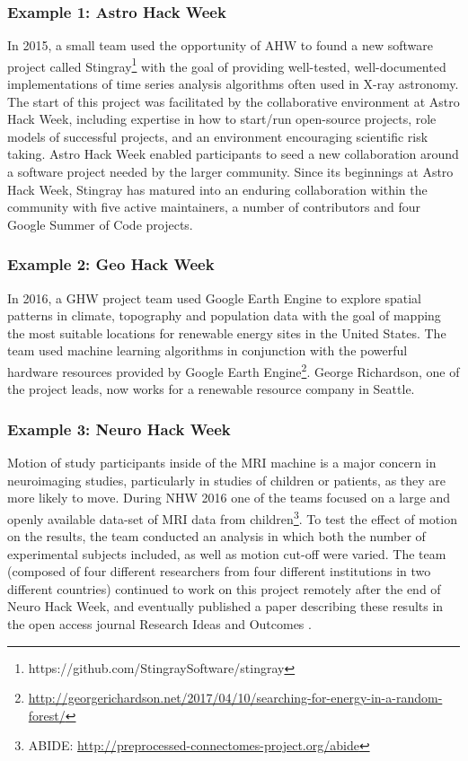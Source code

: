 \subsubsection*{Example 1: Astro Hack Week}
In 2015, a small team used the opportunity of AHW to found a new software project called Stingray\footnote{https://github.com/StingraySoftware/stingray} with the goal of providing well-tested, well-documented implementations of time series analysis algorithms often used in X-ray astronomy.
The start of this project was facilitated by the collaborative environment at Astro Hack Week, including expertise in how to start/run open-source projects, role models of successful projects, and an environment encouraging scientific risk taking. Astro Hack Week enabled participants to seed a new collaboration around a software project needed by the larger community.
Since its beginnings at Astro Hack Week, Stingray has matured into an enduring collaboration within the community with five active maintainers, a number of contributors and four Google Summer of Code projects.
\subsubsection*{Example 2: Geo Hack Week}
In 2016, a GHW project team used Google Earth Engine to explore spatial patterns in climate, topography and population data with the goal of mapping the most suitable locations for renewable energy sites in the United States.
The team used machine learning algorithms in conjunction with the powerful hardware resources provided by Google Earth Engine\footnote{\url{http://georgerichardson.net/2017/04/10/searching-for-energy-in-a-random-forest/}}.
George Richardson, one of the project leads, now works for a renewable resource company in Seattle.
\subsubsection*{Example 3: Neuro Hack Week}
Motion of study participants inside of the MRI machine is a major concern in neuroimaging studies, particularly in studies of children or patients, as they are more likely to move.
During NHW 2016 one of the teams focused on a large and openly available data-set of MRI data from children\footnote{ABIDE: \url{http://preprocessed-connectomes-project.org/abide}}.
To test the effect of motion on the results, the team conducted an analysis in which both the number of experimental subjects included, as well as motion cut-off were varied.
The team (composed of four different researchers from four different institutions in two different countries) continued to work on this project remotely after the end of Neuro Hack Week, and eventually published a paper describing these results in the open access journal Research Ideas and Outcomes \cite{leonard2017}.
